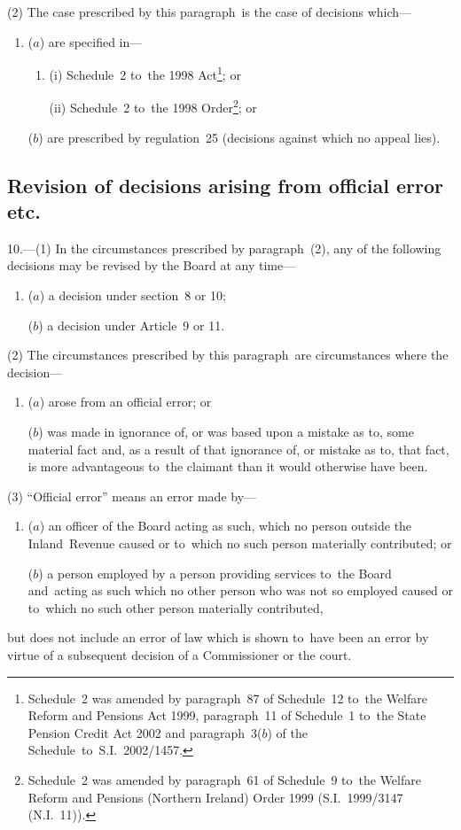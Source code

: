 \documentclass[12pt,a4paper]{article}
\begin{document}
(2) The case prescribed by this paragraph~is the case of decisions which—
\begin{enumerate}\item[]
($a$) are specified in—
\begin{enumerate}\item[]
(i) Schedule~2 to~the 1998 Act\footnote{Schedule~2 was amended by paragraph~87 of Schedule~12 to~the Welfare Reform and Pensions Act 1999, paragraph~11 of Schedule~1 to~the State Pension Credit Act 2002 and paragraph~3($b$)  of the Schedule~to~S.I.~2002/1457.}; or

(ii) Schedule~2 to~the 1998 Order\footnote{Schedule~2 was amended by paragraph~61 of Schedule~9 to~the Welfare Reform and Pensions (Northern Ireland) Order 1999 (S.I.~1999/3147 (N.I.~11)).}; or
\end{enumerate}

($b$) are prescribed by regulation~25 (decisions against which no appeal lies).
\end{enumerate}

\subsection[10. Revision of decisions arising from official error etc.]{Revision of decisions arising from official error etc.}

10.---(1)  In the circumstances prescribed by paragraph~(2), any of the following decisions may be revised by the Board at any time—
\begin{enumerate}\item[]
($a$) a decision under section~8 or 10;

($b$) a decision under Article~9 or 11.
\end{enumerate}

(2) The circumstances prescribed by this paragraph~are circumstances where the decision—
\begin{enumerate}\item[]
($a$) arose from an official error; or

($b$) was made in ignorance of, or was based upon a mistake as to, some material fact and, as a result of that ignorance of, or mistake as to, that fact, is more advantageous to~the claimant than it would otherwise have been.
\end{enumerate}

(3) “Official error” means an error made by—
\begin{enumerate}\item[]
($a$) an officer of the Board acting as such, which no person outside the Inland~Revenue caused or to~which no such person materially contributed; or

($b$) a person employed by a person providing services to~the Board and~acting as such which no other person who was not so employed caused or to~which no such other person materially contributed,
\end{enumerate}
but does not include an error of law which is shown to~have been an error by virtue of a subsequent decision of a Commissioner or the court.
\end{document}
